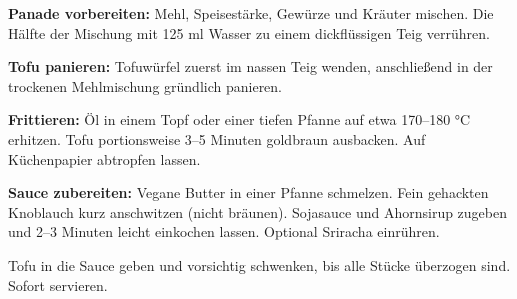 \begin{recipe}
{    \step%
    \textbf{Panade vorbereiten:} Mehl, Speisestärke, Gewürze und Kräuter mischen. Die Hälfte der Mischung mit 125 ml Wasser zu einem dickflüssigen Teig verrühren.
    
    \step%
    \textbf{Tofu panieren:} Tofuwürfel zuerst im nassen Teig wenden, anschließend in der trockenen Mehlmischung gründlich panieren.
    
    \step%
    \textbf{Frittieren:} Öl in einem Topf oder einer tiefen Pfanne auf etwa 170--180 °C erhitzen. Tofu portionsweise 3--5 Minuten goldbraun ausbacken. Auf Küchenpapier abtropfen lassen.
    
    \step%
    \textbf{Sauce zubereiten:} Vegane Butter in einer Pfanne schmelzen. Fein gehackten Knoblauch kurz anschwitzen (nicht bräunen). Sojasauce und Ahornsirup zugeben und 2--3 Minuten leicht einkochen lassen. Optional Sriracha einrühren.
    
    \step%
    Tofu in die Sauce geben und vorsichtig schwenken, bis alle Stücke überzogen sind. Sofort servieren.
}



\end{recipe}